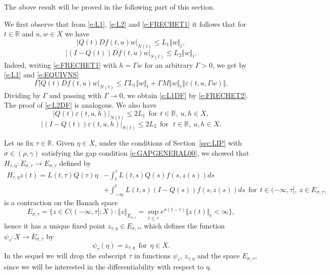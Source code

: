 \documentclass[a4paper,11pt,reqno]{amsart}
\theoremstyle{plain}
\theoremstyle{definition}
\numberwithin{equation}{section}
\newcommand{\R}{\mathbb{R}}
\newcommand{\norm}[1]{\left\Vert#1\right\Vert}
\newcommand{\eps}{\varepsilon}
\renewcommand{\leq}{\leqslant}
\begin{document}
The above result will be proved in the following part of this section.

We first observe that from \eqref{e:L1}, \eqref{e:L2} and \eqref{e:FRECHET1}  it follows that for $t\in\R$ and $u,w\in X$ we have
\begin{equation}\label{e:L1DF}
	|Q(t)Df(t,u)w|_{N(t)}\leq L_1\norm{w}_{t},
\end{equation}
\begin{equation}\label{e:L2DF}
	|(I-Q(t))Df(t,u)w|_{S(t)}\leq L_2\norm{w}_{t}.
\end{equation}
Indeed, writing \eqref{e:FRECHET1} with $h=\Gamma w$ for an arbitrary $\Gamma>0$, we get by \eqref{e:L1} and \eqref{e:EQUIVNS}
$$\Gamma|Q(t)Df(t,u)w|_{N(t)}\leq\Gamma L_1\norm{w}_{t}+\Gamma M\norm{w}_t\norm{\eps(t,u,\Gamma w)}.$$
Dividing by $\Gamma$ and passing with $\Gamma\to 0$, we obtain \eqref{e:L1DF} by \eqref{e:FRECHET2}. The proof of \eqref{e:L2DF} is analogous. We also have
\begin{equation*}%
	|Q(t)\eps(t,u,h)|_{N(t)}\leq 2L_1\ \ \text{for}\ \ t\in\R,\ u,h\in X,
\end{equation*}
\begin{equation*}%
	|(I-Q(t))\eps(t,u,h)|_{S(t)}\leq 2L_2\ \ \text{for}\ \ \ t\in\R,\ u,h\in X.
\end{equation*}

Let us fix $\tau\in\R$. Given $\eta\in X$, under the conditions of Section~\ref{sec:LIP} with $\sigma\in(\rho,\gamma)$ satisfying the gap condition \eqref{e:GAPGENERAL00}, we showed that $H_{\tau,\eta}\colon E_{\sigma,\tau}\to E_{\sigma,\tau}$ defined by
\begin{equation*}%
\begin{split}
H_{\tau,\eta}z(t)=L(t,\tau)Q(\tau)\eta&-\int_{t}^{\tau}L(t,s)Q(s)f(s,z(s))ds\\
&+\int_{-\infty}^{t}L(t,s)(I-Q(s))f(s,z(s))ds\ \ \text{for}\ \  t\in (-\infty,\tau],\ z\in E_{\sigma,\tau},
\end{split}
\end{equation*}
is a contraction on the Banach space 
$$E_{\sigma,\tau}=\{z\in C((-\infty,\tau];X)\colon \norm{z}_{E_{\sigma,\tau}}=\sup_{t\leq\tau}e^{\sigma(t-\tau)}\norm{z(t)}_{t}<\infty\},$$
hence it has a unique fixed point $z_{\tau,\eta}\in E_{\sigma,\tau}$, which defines the function $\psi_\tau\colon X\to E_{\sigma,\tau}$ by
$$\psi_\tau(\eta)=z_{\tau,\eta}\ \ \text{for}\ \ \eta\in X.$$
In the sequel we will drop the subscript $\tau$ in functions $\psi_\tau$, $z_{\tau,\eta}$ and the space $E_{\sigma,\tau}$, since we will be interested in the differentiability with respect to $\eta$.
\end{document}
